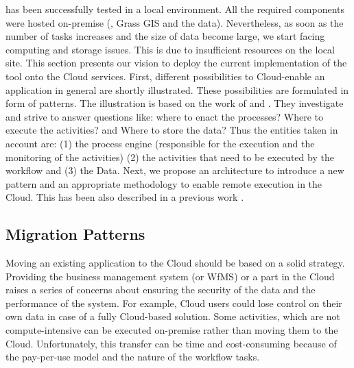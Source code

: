 \label{sec:Cloudmigration}
%
\RenewGrass{} has been successfully tested in a local environment.
%
All the required components were hosted on-premise (\Renew{}, Grass GIS and the data).
%
Nevertheless, as soon as the number of tasks increases and the size of data become large, we start facing computing and storage issues.
%
This is due to insufficient resources on the local site.
%
This section presents our vision to deploy the current implementation of the \RenewGrass{} tool onto the Cloud services.
%
First, different possibilities to Cloud-enable an application in general are shortly illustrated.
%
These possibilities are formulated in form of patterns.
%
The illustration is based on the work of \cite{han10} and \cite{leyman09}.
%
They investigate and strive to answer questions like: where to enact the processes? Where to execute the activities? and Where to store the data?
%
Thus the entities taken in account are: (1) the process engine (responsible for the execution and the monitoring of the activities) (2) the activities that need to be executed by the workflow and (3) the Data.
%
Next, we propose an architecture to introduce a new pattern and an appropriate methodology to enable remote execution in the Cloud.
%
This has been also described in a previous work \cite{Bendoukha+15}.
%
\subsection{Migration Patterns}
%
Moving an existing application to the Cloud should be based on a solid strategy.
%
Providing the business management system (or WfMS) or a part in the Cloud raises a series of concerns about ensuring the security of the data and the performance of the system. 
%
For example, Cloud users could lose control on their own data in case of a fully Cloud-based solution. 
%
Some activities, which are not compute-intensive can be executed on-premise rather than moving them to the Cloud. 
%
Unfortunately, this transfer can be time and cost-consuming because of the pay-per-use model and the nature of the workflow tasks.


